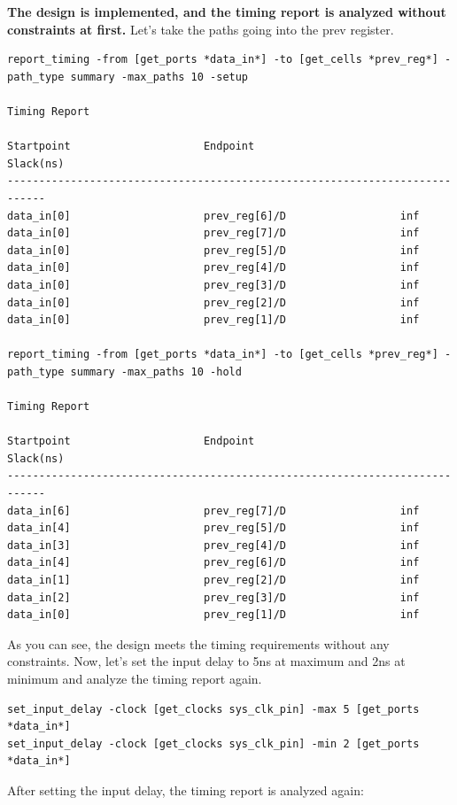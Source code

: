\documentclass{report}
\begin{document}
\textbf{The design is implemented, and the timing report is analyzed without constraints at first.}
Let's take the paths going into the prev register.
\begin{verbatim}
report_timing -from [get_ports *data_in*] -to [get_cells *prev_reg*] -path_type summary -max_paths 10 -setup

Timing Report

Startpoint                     Endpoint                       Slack(ns)     
----------------------------------------------------------------------------
data_in[0]                     prev_reg[6]/D                  inf           
data_in[0]                     prev_reg[7]/D                  inf           
data_in[0]                     prev_reg[5]/D                  inf           
data_in[0]                     prev_reg[4]/D                  inf           
data_in[0]                     prev_reg[3]/D                  inf           
data_in[0]                     prev_reg[2]/D                  inf           
data_in[0]                     prev_reg[1]/D                  inf       

report_timing -from [get_ports *data_in*] -to [get_cells *prev_reg*] -path_type summary -max_paths 10 -hold

Timing Report

Startpoint                     Endpoint                       Slack(ns)     
----------------------------------------------------------------------------
data_in[6]                     prev_reg[7]/D                  inf           
data_in[4]                     prev_reg[5]/D                  inf           
data_in[3]                     prev_reg[4]/D                  inf           
data_in[4]                     prev_reg[6]/D                  inf           
data_in[1]                     prev_reg[2]/D                  inf           
data_in[2]                     prev_reg[3]/D                  inf           
data_in[0]                     prev_reg[1]/D                  inf
\end{verbatim}
As you can see, the design meets the timing requirements without any constraints. Now, let's set the input delay to 5ns at maximum and 2ns at minimum and analyze the timing report again.
\begin{verbatim}
set_input_delay -clock [get_clocks sys_clk_pin] -max 5 [get_ports *data_in*]
set_input_delay -clock [get_clocks sys_clk_pin] -min 2 [get_ports *data_in*]
\end{verbatim}
After setting the input delay, the timing report is analyzed again:
\end{document}
